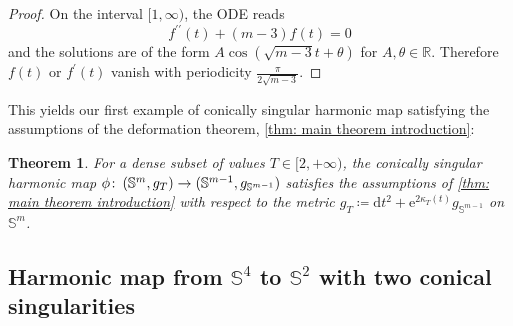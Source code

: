 \documentclass{article}
\numberwithin{equation}{section}        %
\theoremstyle{bfnote}
\newtheorem{thm}{Theorem}[section]          %
\theoremstyle{definition}
\theoremstyle{bfremark}
\newcommand{\col}{\colon \thinspace}        %
\newcommand{\R}{\mathbb{R}}                 %
\newcommand{\Sp}{\mathbb{S}}                %
\newcommand{\diff}{\mathrm{d}}                      %
\begin{document}
\begin{proof}
    On the interval $[1,\infty)$, the ODE reads
    \begin{equation*}
        f^{\prime\prime}(t) + (m-3)f(t) = 0
    \end{equation*}
    and the solutions are of the form $A\cos(\sqrt{m-3}t+\theta)$ for $A, \theta \in \R$. Therefore $f(t)$ or $f^\prime(t)$ vanish with periodicity $\tfrac{\pi}{2\sqrt{m-3}}$.
\end{proof}

This yields our first example of conically singular harmonic map satisfying the assumptions of the deformation theorem, \cref{thm: main theorem introduction}:

\begin{thm}
    For a dense subset of values $T \in [2,+\infty)$, the conically singular harmonic map $\phi \col (\Sp^m,g_T) \to (\Sp^{m-1},g_{\Sp^{m-1}})$ satisfies the assumptions of \cref{thm: main theorem introduction} with respect to the metric $g_T \coloneqq \diff t^2 + \mathrm{e}^{2\kappa_T(t)}g_{\Sp^{m-1}}$ on $\Sp^m$.
\end{thm}


    \subsection{Harmonic map from $\mathbb{S}^4$ to $\Sp^2$ with two conical singularities}     \label{sec: map S^4 to S^2}
\end{document}

